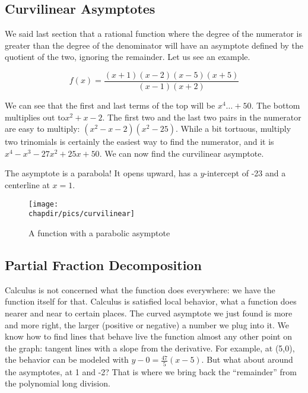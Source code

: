 

\subsection{Curvilinear Asymptotes}
We said last section that a rational function where the degree of the numerator is greater than
the degree of the denominator will have an asymptote defined by the quotient of the two,
ignoring the remainder.  Let us see an example.

$$
f(x)=\frac{(x+1)(x-2)(x-5)(x+5)}{(x-1)(x+2)}
$$

We can see that the first and last terms of the top will be $x^4 \dots +50$.  The bottom 
multiplies out to$x^2+x-2$.  The first two and the last two pairs in the numerator are easy 
to multiply: $(x^2-x-2)(x^2-25)$.  While a bit tortuous, multiply two trinomials is certainly
the easiest way to find the numerator, and it is $x^4-x^3-27x^2+25x+50$.  We can now find
the curvilinear asymptote.


The asymptote is a parabola!  It opens upward, has a $y$-intercept of -23 and a centerline 
at $x=1$.

\begin{figure}
\begin{centering}
\texttt{[image: \\chapdir/pics/curvilinear]}
\caption{A function with a parabolic asymptote}
\end{centering}
\end{figure}

\subsection{Partial Fraction Decomposition}
Calculus is not concerned what the function does everywhere: we have the function itself
for that.  Calculus is satisfied local behavior, what a function does nearer and near to
certain places.  The curved asymptote we just found is more and more right, the larger 
(positive or negative) a number we plug into it.  We know how to find lines that behave
live the function almost any other point on the graph: tangent lines with a slope from
the derivative.  For example, at (5,0), the behavior can be modeled with 
$y-0 = \frac{47}{5}(x-5)$.  But what about around the asymptotes, at 1 and -2?  That is
where we bring back the ``remainder'' from the polynomial long division.

